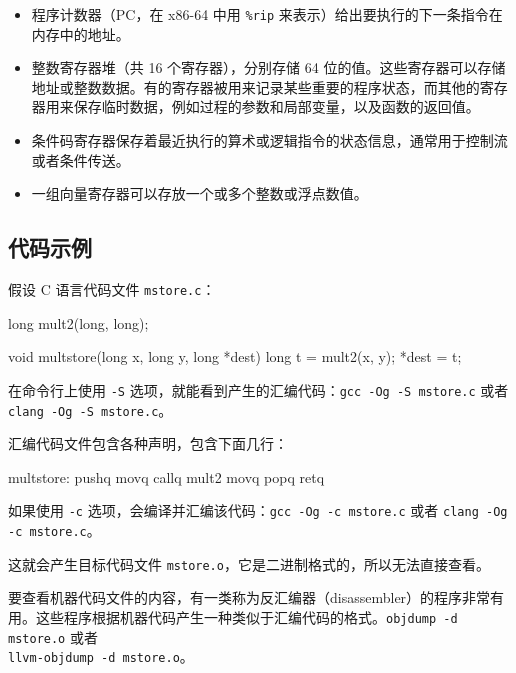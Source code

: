 \begin{itemize}
    \item 程序计数器（PC，在 x86-64 中用 \verb|%rip| 来表示）给出要执行的下一条指令在内存中的地址。
    \item 整数寄存器堆（共 16 个寄存器），分别存储 64 位的值。这些寄存器可以存储地址或整数数据。有的寄存器被用来记录某些重要的程序状态，而其他的寄存器用来保存临时数据，例如过程的参数和局部变量，以及函数的返回值。
    \item 条件码寄存器保存着最近执行的算术或逻辑指令的状态信息，通常用于控制流或者条件传送。
    \item 一组向量寄存器可以存放一个或多个整数或浮点数值。
\end{itemize}

\subsection{代码示例}

假设 C 语言代码文件 \verb|mstore.c|：

\begin{cppcode}
long mult2(long, long);

void multstore(long x, long y, long *dest) {
  long t = mult2(x, y);
  *dest = t;
}
\end{cppcode}

在命令行上使用 \verb|-S| 选项，就能看到产生的汇编代码：\verb|gcc -Og -S mstore.c| 或者 \verb|clang -Og -S mstore.c|。

汇编代码文件包含各种声明，包含下面几行：

\begin{gascode}
multstore:
    pushq   %
    movq    %
    callq   mult2
    movq    %
    popq    %
    retq
\end{gascode}

如果使用 \verb|-c| 选项，会编译并汇编该代码：\verb|gcc -Og -c mstore.c| 或者 \verb|clang -Og -c mstore.c|。

这就会产生目标代码文件 \verb|mstore.o|，它是二进制格式的，所以无法直接查看。


要查看机器代码文件的内容，有一类称为反汇编器（disassembler）的程序非常有用。这些程序根据机器代码产生一种类似于汇编代码的格式。\verb|objdump -d mstore.o| 或者\\ \verb|llvm-objdump -d mstore.o|。

